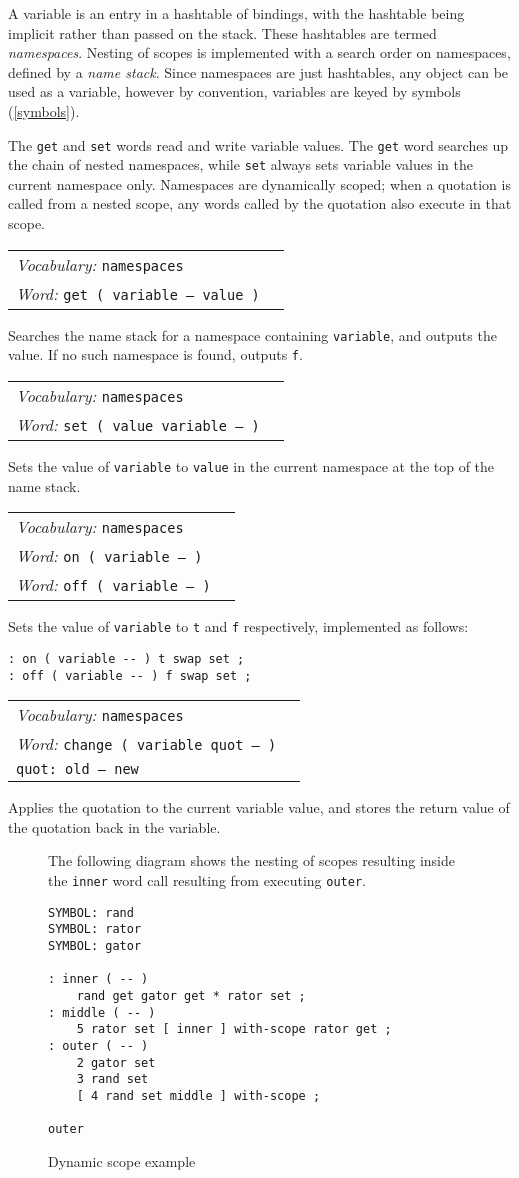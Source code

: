 \documentclass{book}
\newcommand{\vocabulary}[1]{\emph{Vocabulary:} \texttt{#1}&\\}
\newcommand{\ordinaryword}[2]{\index{\texttt{#1}}\emph{Word:} \texttt{#2}&\\}
\newcommand{\wordtable}[1]{

\begin{tabularx}{12cm}[t]{lX}
\hline
#1
\hline
\end{tabularx}

}
\begin{document}
A variable is an entry in a hashtable of bindings, with the hashtable being implicit rather than passed on the stack. These hashtables are termed \emph{namespaces}. Nesting of scopes is implemented with a search order on namespaces, defined by a \emph{name stack}. Since namespaces are just hashtables, any object can be used as a variable, however by convention, variables are keyed by symbols (\ref{symbols}). 

The \texttt{get} and \texttt{set} words read and write variable values. The \texttt{get} word searches up the chain of nested namespaces, while \texttt{set} always sets variable values in the current namespace only. Namespaces are dynamically scoped; when a quotation is called from a nested scope, any words called by the quotation also execute in that scope.

\wordtable{
\vocabulary{namespaces}
\ordinaryword{get}{get ( variable -- value )}

}
Searches the name stack for a namespace containing \texttt{variable}, and outputs the value. If no such namespace is found, outputs \texttt{f}.
\wordtable{
\vocabulary{namespaces}
\ordinaryword{set}{set ( value variable -- )}
}
Sets the value of \texttt{variable} to \texttt{value} in the current namespace at the top of the name stack.
\wordtable{
\vocabulary{namespaces}
\ordinaryword{on}{on ( variable -- )}
\ordinaryword{off}{off ( variable -- )}
}
Sets the value of \texttt{variable} to \texttt{t} and \texttt{f} respectively, implemented as follows:
\begin{verbatim}
: on ( variable -- ) t swap set ;
: off ( variable -- ) f swap set ;
\end{verbatim}
\wordtable{
\vocabulary{namespaces}
\ordinaryword{change}{change ( variable quot -- )}
\texttt{quot:~old -- new}\\
}
Applies the quotation to the current variable value, and stores the return value of the quotation back in the variable.
\begin{figure}
\caption{Dynamic scope example}
The following diagram shows the nesting of scopes resulting inside the \texttt{inner} word call resulting from executing \texttt{outer}.
\begin{verbatim}
SYMBOL: rand
SYMBOL: rator
SYMBOL: gator

: inner ( -- )
    rand get gator get * rator set ;
: middle ( -- )
    5 rator set [ inner ] with-scope rator get ;
: outer ( -- )
    2 gator set
    3 rand set
    [ 4 rand set middle ] with-scope ;

outer
\end{verbatim}
\begin{center}
\end{center}
\end{figure}
\end{document}
